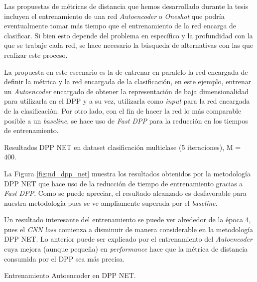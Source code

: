 Las propuestas de métricas de distancia que hemos desarrollado durante la tesis incluyen el entrenamiento de una red \textit{Autoencoder} o \textit{Oneshot} que podría eventualmente tomar más tiempo que el entrenamiento de la red encarga de clasificar. Si bien esto depende del problema en específico y la profundidad con la que se trabaje cada red, se hace necesario la búsqueda de alternativas con las que realizar este proceso. 

\vspace{0.2cm}

La propuesta en este escenario es la de entrenar en paralelo la red encargada de definir la métrica y la red encargada de la clasificación, en este ejemplo, entrenar un \textit{Autoencoder} encargado de obtener la representación de baja dimensionalidad para utilizarla en el DPP y a su vez, utilizarla como \textit{input} para la red encargada de la clasificación. Por otro lado, con el fin de hacer la red lo más comparable posible a un \textit{baseline}, se hace uso de \textit{Fast DPP} para la reducción en los tiempos de entrenamiento.

\begin{images}[\label{fig:nd_dpp_net}]{\centering Resultados DPP NET en dataset clasificación multiclase (5 iteraciones), M = 400.}
\end{images}

La Figura \ref{fig:nd_dpp_net} muestra los resultados obtenidos por la metodología DPP NET que hace uso de la reducción de tiempo de entrenamiento gracias a \textit{Fast DPP}. Como se puede apreciar, el resultado alcanzado es desfavorable para nuestra metodología pues se ve ampliamente superada por el \textit{baseline}. 

\vspace{0.2cm}

Un resultado interesante del entrenamiento se puede ver alrededor de la época 4, pues el \textit{CNN loss} comienza a disminuir de manera considerable en la metodología DPP NET. Lo anterior puede ser explicado por el entrenamiento del \textit{Autoencoder} cuya mejora (aunque pequeña) en \textit{performance} hace que la métrica de distancia consumida por el DPP sea más precisa. 

\begin{images}[\label{fig:nd_autoencoder_dpp_net}]{\centering Entrenamiento Autoencoder en DPP NET.}
\end{images}

